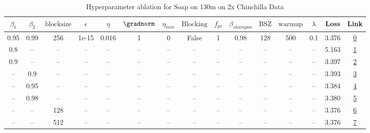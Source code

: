\begin{table}[H]
\centering
\caption{Hyperparameter ablation for Soap on 130m on 2x Chinchilla Data}
\label{tab:ablation_soap_130m_on_2x_chinchilla_data}
\begin{tabular}{ccccccccccccccc}
\toprule
$\beta_1$ & $\beta_2$ & $\mathrm{block size}$ & $\epsilon$ & $\eta$ & $\gradnorm$ & $\eta_{min}$ & $\mathrm{Blocking}$ & $f_{pc}$ & $\beta_{shampoo}$ & $\mathrm{BSZ}$ & $\mathrm{warmup}$ & $\lambda$ & Loss & Link \\
\midrule
0.95 & 0.99 & 256 & 1e-15 & 0.016 & 1 & 0 & False & 1 & 0.98 & 128 & 500 & 0.1 & 3.376 & \href{https://wandb.ai/stanford-mercury/optimizer-scaling/runs/sweep-130m-5B-soap04fae1lr0.016-wd0.1-minlr0-warmup500-b10.95-b2-1074a6}{0} \\
\midrule
0.8 & -- & -- & -- & -- & -- & -- & -- & -- & -- & -- & -- & -- & 5.163 & \href{https://wandb.ai/stanford-mercury/optimizer-scaling/runs/sweep-130m-5B-soap5ef8calr0.016-wd0.1-minlr0-warmup500-b10.8-b20-152142}{1} \\
0.9 & -- & -- & -- & -- & -- & -- & -- & -- & -- & -- & -- & -- & 3.397 & \href{https://wandb.ai/stanford-mercury/optimizer-scaling/runs/sweep-130m-5B-soap0f87cclr0.016-wd0.1-minlr0-warmup500-b10.9-b20-a97c0f}{2} \\
-- & 0.9 & -- & -- & -- & -- & -- & -- & -- & -- & -- & -- & -- & 3.393 & \href{https://wandb.ai/stanford-mercury/optimizer-scaling/runs/sweep-130m-5B-soap986b9dlr0.016-wd0.1-minlr0-warmup500-b10.95-b2-c68a63}{3} \\
-- & 0.95 & -- & -- & -- & -- & -- & -- & -- & -- & -- & -- & -- & 3.384 & \href{https://wandb.ai/stanford-mercury/optimizer-scaling/runs/sweep-130m-5B-soapfe15e2lr0.016-wd0.1-minlr0-warmup500-b10.95-b2-3ad392}{4} \\
-- & 0.98 & -- & -- & -- & -- & -- & -- & -- & -- & -- & -- & -- & 3.380 & \href{https://wandb.ai/stanford-mercury/optimizer-scaling/runs/sweep-130m-5B-soap7355b2lr0.016-wd0.1-minlr0-warmup500-b10.95-b2-5430b0}{5} \\
-- & -- & 128 & -- & -- & -- & -- & -- & -- & -- & -- & -- & -- & 3.376 & \href{https://wandb.ai/stanford-mercury/optimizer-scaling/runs/sweep-130m-5B-soap961d04lr0.016-wd0.1-minlr0-warmup500-b10.95-b2-da762c}{6} \\
-- & -- & 512 & -- & -- & -- & -- & -- & -- & -- & -- & -- & -- & 3.376 & \href{https://wandb.ai/stanford-mercury/optimizer-scaling/runs/sweep-130m-5B-soap95f45flr0.016-wd0.1-minlr0-warmup500-b10.95-b2-7e2136}{7} \\

\end{tabular}
\end{table}
